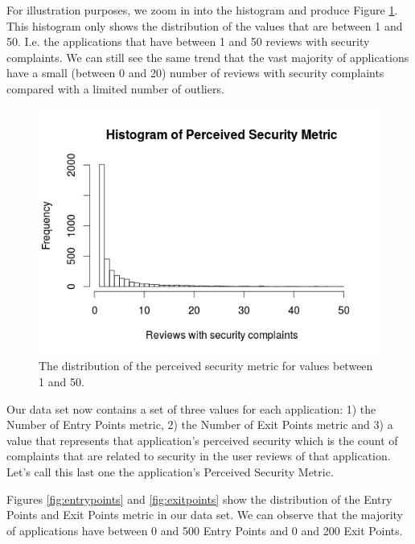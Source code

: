 \documentclass{sig-alternate}
\begin{document}
For illustration purposes, we zoom in into the histogram and produce Figure \ref{fig:perceivedsecuritylimit50}. This histogram only shows the distribution of the values that are between 1 and 50. I.e. the applications that have between 1 and 50 reviews with security complaints. We can still see the same trend that the vast majority of applications have a small (between 0 and 20) number of reviews with security complaints compared with a limited number of outliers.

\begin{figure}
  \centering
  \includegraphics[scale=0.50]{figs/histogram_per_sec_limit_50.png}
  \caption{The distribution of the perceived security metric for values between 1 and 50.}
  \label{fig:perceivedsecuritylimit50}
\end{figure}

Our data set now contains a set of three values for each application: 1) the Number of Entry Points metric, 2) the Number of Exit Points metric and 3) a value that represents that application's perceived security which is the count of complaints that are related to security in the user reviews of that application. Let's call this last one the application's Perceived Security Metric.

Figures \ref{fig:entrypoints} and \ref{fig:exitpoints} show the distribution of the Entry Points and Exit Points metric in our data set. We can observe that the majority of applications have between 0 and 500 Entry Points and 0 and 200 Exit Points.
\end{document}
